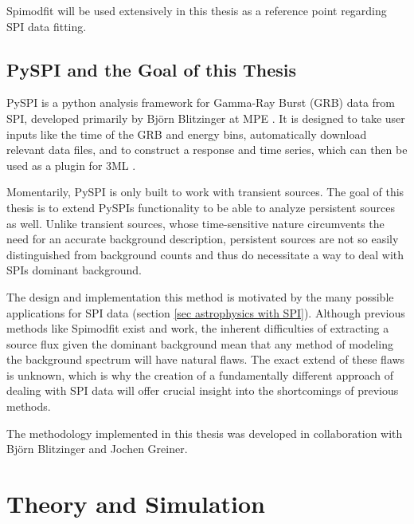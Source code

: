 \documentclass{report}
\begin{document}
Spimodfit will be used extensively in this thesis as a reference point regarding SPI data fitting.



\section{PySPI and the Goal of this Thesis}
PySPI is a python analysis framework for Gamma-Ray Burst (GRB) data from SPI, developed primarily by Björn Blitzinger at MPE \cite{Biltzinger2022}. It is designed to take user inputs like the time of the GRB and energy bins, automatically download relevant data files, and to construct a response and time series, which can then be used as a plugin for 3ML \cite{3ml}.

Momentarily, PySPI is only built to work with transient sources. The goal of this thesis is to extend PySPIs functionality to be able to analyze persistent sources as well. Unlike transient sources, whose time-sensitive nature circumvents the need for an accurate background description, persistent sources are not so easily distinguished from background counts and thus do necessitate a way to deal with SPIs dominant background.

The design and implementation this method is motivated by the many possible applications for SPI data (section \ref{sec astrophysics with SPI}). Although previous methods like Spimodfit exist and work, the inherent difficulties of extracting a source flux given the dominant background mean that any method of modeling the background spectrum will have natural flaws. The exact extend of these flaws is unknown, which is why the creation of a fundamentally different approach of dealing with SPI data will offer crucial insight into the shortcomings of previous methods.

The methodology implemented in this thesis was developed in collaboration with Björn Blitzinger and Jochen Greiner.

\chapter{Theory and Simulation}
\end{document}
